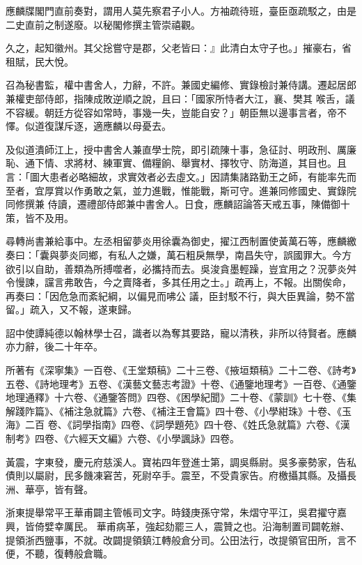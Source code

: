 \begin{pinyinscope}
 應麟牒閣門直前奏對，謂用人莫先察君子小人。方袖疏待班，臺臣亟疏駁之，由是二史直前之制遂廢。以秘閣修撰主管崇禧觀。



 久之，起知徽州。其父捴嘗守是郡，父老皆曰：』此清白太守子也。」摧豪右，省租賦，民大悅。



 召為秘書監，權中書舍人，力辭，不許。兼國史編修、實錄檢討兼侍講。遷起居郎兼權吏部侍郎，指陳成敗逆順之說，且曰：「國家所恃者大江，襄、樊其
 喉舌，議不容緩。朝廷方從容如常時，事幾一失，豈能自安？」朝臣無以邊事言者，帝不懌。似道復謀斥逐，適應麟以母憂去。



 及似道潰師江上，授中書舍人兼直學士院，即引疏陳十事，急征討、明政刑、厲廉恥、通下情、求將材、練軍實、備糧餉、舉實材、擇牧守、防海道，其目也。且言：「圖大患者必略細故，求實效者必去虛文。」因請集諸路勤王之師，有能率先而至者，宜厚賞以作勇敢之氣，並力進戰，惟能戰，斯可守。進兼同修國史、實錄院同修撰兼
 侍讀，遷禮部侍郎兼中書舍人。日食，應麟詔論答天戒五事，陳備御十策，皆不及用。



 尋轉尚書兼給事中。左丞相留夢炎用徐囊為御史，擢江西制置使黃萬石等，應麟繳奏曰：「囊與夢炎同鄉，有私人之嫌，萬石粗戾無學，南昌失守，誤國罪大。今方欲引以自助，善類為所搏噬者，必攜持而去。吳浚貪墨輕躁，豈宜用之？況夢炎舛令慢諫，讜言弗敢告，今之賣降者，多其任用之士。」疏再上，不報。出關俟命，再奏曰：「因危急而紊紀綱，以偏見而咈公
 議，臣封駁不行，與大臣異論，勢不當留。」疏入，又不報，遂東歸。



 詔中使譚純德以翰林學士召，識者以為奪其要路，寵以清秩，非所以待賢者。應麟亦力辭，後二十年卒。



 所著有《深寧集》一百卷、《王堂類稿》二十三卷、《掖垣類稿》二十二卷、《詩考》五卷、《詩地理考》五卷、《漢藝文藝志考證》十卷、《通鑒地理考》一百卷、《通鑒地理通釋》十六卷、《通鑒答問》四卷、《困學紀聞》二十卷、《蒙訓》七十卷、《集解踐阼篇》、《補注急就篇》六卷、《補注王會篇》四十卷、《小學紺珠》十卷、《玉海》二百
 卷、《詞學指南》四卷、《詞學題苑》四十卷、《姓氏急就篇》六卷、《漢制考》四卷、《六經天文編》六卷、《小學諷詠》四卷。



 黃震，字東發，慶元府慈溪人。寶祐四年登進士第，調吳縣尉。吳多豪勢家，告私債則以屬尉，民多饑凍窘苦，死尉卒手。震至，不受貴家告。府檄攝其縣。及攝長洲、華亭，皆有聲。



 浙東提舉常平王華甫闢主管帳司文字。時錢庚孫守常，朱熠守平江，吳君擢守嘉興，皆倚嬖幸厲民。
 華甫病革，強起劾罷三人，震贊之也。沿海制置司闢乾辦、提領浙西鹽事，不就。改闢提領鎮江轉般倉分司。公田法行，改提領官田所，言不便，不聽，復轉般倉職。




\end{pinyinscope}
